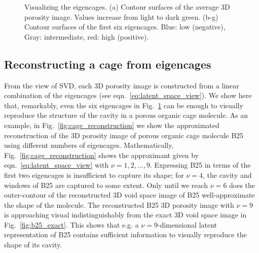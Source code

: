 \documentclass[journal=jacsat,manuscript=article,layout=traditional]{achemso}
\begin{document}
\begin{figure}
		\qquad
	\caption{Visualizing the eigencages. (a) Contour surfaces of the average 3D porosity image. {\color{red} Values increase from light to dark green.} (b-g) Contour surfaces of the first six eigencages. Blue: low (negative), Gray: intermediate, red: high (positive).
	} \label{fig:eigencages}
\end{figure}

\subsection{Reconstructing a cage from eigencages} From the view of SVD, each 3D porosity image is constructed from a linear combination of the eigencages (see eqn.~\ref{eq:latent_space_view}). We show here that, remarkably, even the six eigencages in Fig.~\ref{fig:eigencages} can be enough to visually reproduce the structure of the cavity in a porous organic cage molecule. As an example, in Fig.~\ref{fig:cage_reconstruction} we show the approximated reconstruction of the 3D porosity image of porous organic cage molecule B25 using different numbers of eigencages. Mathematically, Fig.~\ref{fig:cage_reconstruction} shows the approximant given by eqn.~\ref{eq:latent_space_view} with $\nu=1,2,...,9$. Expressing B25 in terms of the first two eigencages is insufficient to capture its shape; for $\nu=4$, the cavity and windows of B25 are captured to some extent. Only until we reach $\nu=6$ does the outer-contour of the reconstructed 3D void space image of B25 well-approximate the shape of the molecule. The reconstructed B25 3D porosity image with $\nu=9$ is approaching visual indistinguishably from the exact 3D void space image in Fig.~\ref{fig:b25_exact}. This shows that e.g. a $\nu=9$-dimensional latent representation of B25 contains sufficient information to visually reproduce the shape of its cavity.
\end{document}
